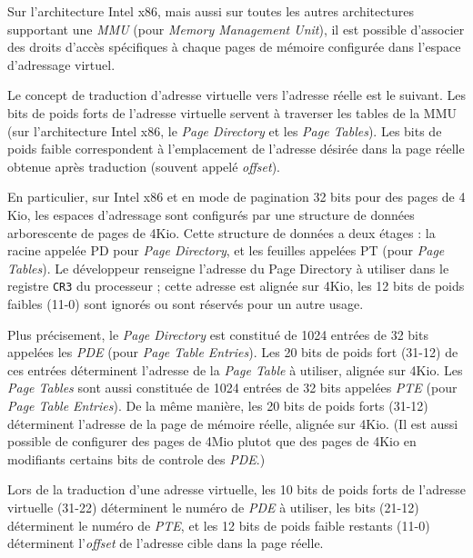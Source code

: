 Sur l'architecture Intel x86, mais aussi sur toutes les autres architectures supportant une \emph{MMU} (pour \emph{Memory Management Unit}), il est possible d'associer des droits d'accès spécifiques à chaque pages de mémoire configurée dans l'espace d'adressage virtuel.

Le concept de traduction d'adresse virtuelle vers l'adresse réelle est le suivant. Les bits de poids forts de l'adresse virtuelle servent à traverser les tables de la MMU (sur l'architecture Intel x86, le \emph{Page Directory} et les \emph{Page Tables}). Les bits de poids faible correspondent à l'emplacement de l'adresse désirée dans la page réelle obtenue après traduction (souvent appelé \emph{offset}).

En particulier, sur Intel x86 et en mode de pagination 32 bits pour des pages de 4 Kio, les espaces d'adressage sont configurés par une structure de données arborescente de pages de 4Kio. Cette structure de données a deux étages : la racine appelée PD pour \emph{Page Directory}, et les feuilles appelées PT (pour \emph{Page Tables}). Le développeur renseigne l'adresse du Page Directory à utiliser dans le registre \texttt{CR3} du processeur ; cette adresse est alignée sur 4Kio, les 12 bits de poids faibles (11-0) sont ignorés ou sont réservés pour un autre usage.

Plus précisement, le \emph{Page Directory} est constitué de 1024 entrées de 32 bits appelées les \emph{PDE} (pour \emph{Page Table Entries}). Les 20 bits de poids fort (31-12) de ces entrées déterminent l'adresse de la \emph{Page Table} à utiliser, alignée sur 4Kio. Les \emph{Page Tables} sont aussi constituée de 1024 entrées de 32 bits appelées \emph{PTE} (pour \emph{Page Table Entries}). De la même manière, les 20 bits de poids forts (31-12) déterminent l'adresse de la page de mémoire réelle, alignée sur 4Kio. (Il est aussi possible de configurer des pages de 4Mio plutot que des pages de 4Kio en modifiants certains bits de controle des \emph{PDE}.)

Lors de la traduction d'une adresse virtuelle, les 10 bits de poids forts de l'adresse virtuelle (31-22) déterminent le numéro de \emph{PDE} à utiliser, les bits (21-12) déterminent le numéro de \emph{PTE}, et les 12 bits de poids faible restants (11-0) déterminent l'\emph{offset} de l'adresse cible dans la page réelle.~\cite{intel_32bits_paging}

